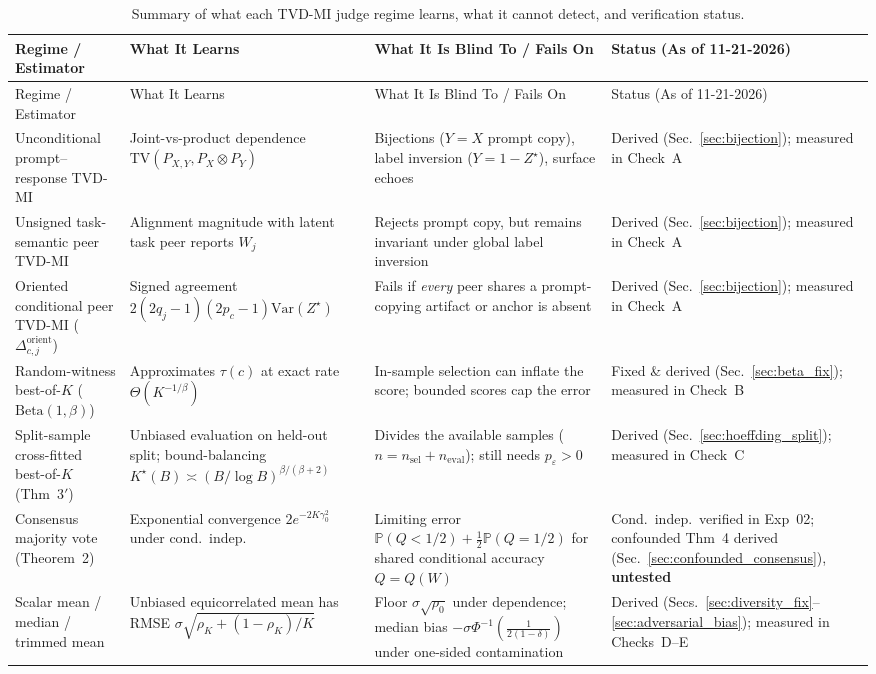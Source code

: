 \documentclass[11pt]{article}
\newcommand{\Prob}{\mathbb{P}}
\newcommand{\Var}{\mathrm{Var}}
\newcommand{\TV}{\mathrm{TV}}
\begin{document}
{\small
\renewcommand{\arraystretch}{1.18}
\setlength{\tabcolsep}{4pt}
\begin{longtable}{@{}>{\raggedright\arraybackslash}p{3.1cm}>{\raggedright\arraybackslash}p{3.8cm}>{\raggedright\arraybackslash}p{4.3cm}>{\raggedright\arraybackslash}p{3.1cm}@{}}
\caption{Summary of what each TVD-MI judge regime learns, what it cannot detect, and verification status.}
\label{tab:summary_limits}\\
\toprule
Regime / Estimator & What It Learns & What It Is Blind To / Fails On & Status (As of 11-21-2026) \\
\midrule
\endfirsthead
\toprule
Regime / Estimator & What It Learns & What It Is Blind To / Fails On & Status (As of 11-21-2026) \\
\midrule
\endhead
Unconditional prompt--response TVD-MI & Joint-vs-product dependence $\TV(P_{X,Y}, P_X\otimes P_Y)$ & Bijections ($Y=X$ prompt copy), label inversion ($Y=1-Z^\star$), surface echoes & Derived (Sec.~\ref{sec:bijection}); measured in Check~A \\
\midrule
Unsigned task-semantic peer TVD-MI & Alignment magnitude with latent task peer reports $W_j$ & Rejects prompt copy, but remains invariant under global label inversion & Derived (Sec.~\ref{sec:bijection}); measured in Check~A \\
\midrule
Oriented conditional peer TVD-MI ($\Delta^{\mathrm{orient}}_{c,j}$) & Signed agreement $2(2q_j-1)(2p_c-1)\Var(Z^\star)$ & Fails if \emph{every} peer shares a prompt-copying artifact or anchor is absent & Derived (Sec.~\ref{sec:bijection}); measured in Check~A \\
\midrule
Random-witness best-of-$K$ ($\mathrm{Beta}(1,\beta)$) & Approximates $\tau(c)$ at exact rate $\Theta(K^{-1/\beta})$ & In-sample selection can inflate the score; bounded scores cap the error & Fixed \& derived (Sec.~\ref{sec:beta_fix}); measured in Check~B \\
\midrule
Split-sample cross-fitted best-of-$K$ (Thm~3$'$) & Unbiased evaluation on held-out split; bound-balancing $K^\star(B) \asymp (B/\log B)^{\beta/(\beta+2)}$ & Divides the available samples ($n = n_{\mathrm{sel}} + n_{\mathrm{eval}}$); still needs $p_\varepsilon > 0$ & Derived (Sec.~\ref{sec:hoeffding_split}); measured in Check~C \\
\midrule
Consensus majority vote (Theorem~2) & Exponential convergence $2e^{-2K\gamma_0^2}$ under cond.\ indep. & Limiting error $\Prob(Q<1/2)+\frac12\Prob(Q=1/2)$ for shared conditional accuracy $Q=Q(W)$ & Cond.\ indep.\ verified in Exp~02; confounded Thm~4 derived (Sec.~\ref{sec:confounded_consensus}), \textbf{untested} \\
\midrule
Scalar mean / median / trimmed mean & Unbiased equicorrelated mean has RMSE $\sigma\sqrt{\rho_K+(1-\rho_K)/K}$ & Floor $\sigma\sqrt{\rho_0}$ under dependence; median bias $-\sigma\Phi^{-1}(\frac{1}{2(1-\delta)})$ under one-sided contamination & Derived (Secs.~\ref{sec:diversity_fix}--\ref{sec:adversarial_bias}); measured in Checks~D--E \\
\bottomrule
\end{longtable}
}
\end{document}

